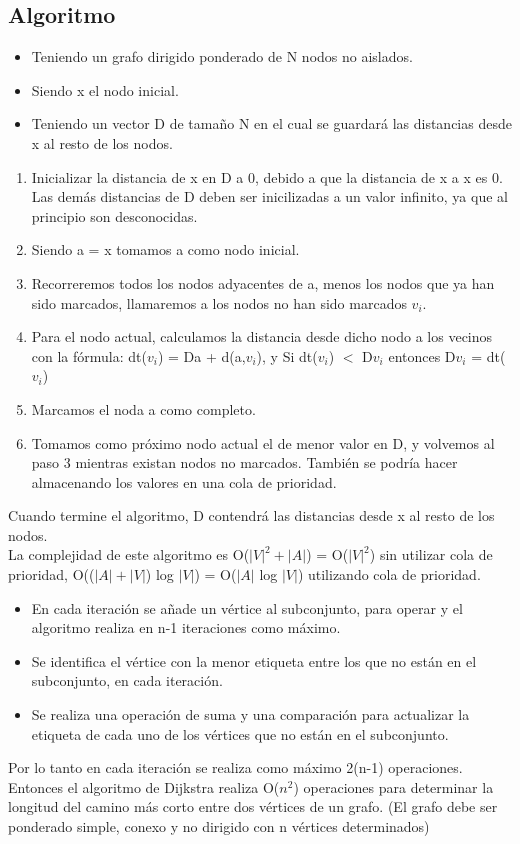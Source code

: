\subsection{Algoritmo}\label{Explicacion-algoritmo-Dijkstra}
\begin{itemize}
\item
Teniendo un grafo dirigido ponderado de N nodos no aislados.
\item 
Siendo x el nodo inicial.
\item 
Teniendo un vector D de tamaño N en el cual se guardará las distancias desde x al resto de los nodos.
\end{itemize}

\begin{enumerate}
\item
Inicializar la distancia de x en D a 0, debido a que la distancia de x a x es 0. Las demás distancias de D deben ser inicilizadas a un valor infinito, ya que al principio son desconocidas.
\item
Siendo a = x tomamos a como nodo inicial.
\item
Recorreremos todos los nodos adyacentes de a, menos los nodos que ya han sido marcados, llamaremos a los nodos no han sido marcados $v_i$.
\item
Para el nodo actual, calculamos la distancia desde dicho nodo a los vecinos con la fórmula: dt($v_i$) = Da + d(a,$v_i$), y Si dt($v_i$) $<$ D$v_i$ entonces D$v_i$ = dt($v_i$)
\item
Marcamos el noda a como completo.
\item
Tomamos como próximo nodo actual el de menor valor en D, y volvemos al paso 3 mientras existan nodos no marcados. También se podría hacer almacenando los valores en una cola de prioridad.

\end{enumerate}

Cuando termine el algoritmo, D contendrá las distancias desde x al resto de los nodos.
\\
La complejidad de este algoritmo es O($|V|^2+|A|$) = O($|V|^2$) sin utilizar cola de prioridad, O(($|A|+|V|$) log $|V|$) = O($|A|$ log $|V|$) utilizando cola de prioridad.

\begin{itemize}
\item
En cada iteración se añade un vértice al subconjunto, para operar y el algoritmo realiza en n-1 iteraciones como máximo.
\item
Se identifica el vértice con la menor etiqueta entre los que no están en el subconjunto, en cada iteración.
\item
Se realiza una operación de suma y una comparación para actualizar la etiqueta de cada uno de los vértices que no están en el subconjunto.

\end{itemize}

Por lo tanto en cada iteración se realiza como máximo 2(n-1) operaciones. Entonces el algoritmo de Dijkstra realiza O($n^2$) operaciones para determinar la longitud del camino más corto entre dos vértices de un grafo. (El grafo debe ser ponderado simple, conexo y no dirigido con n vértices determinados)


